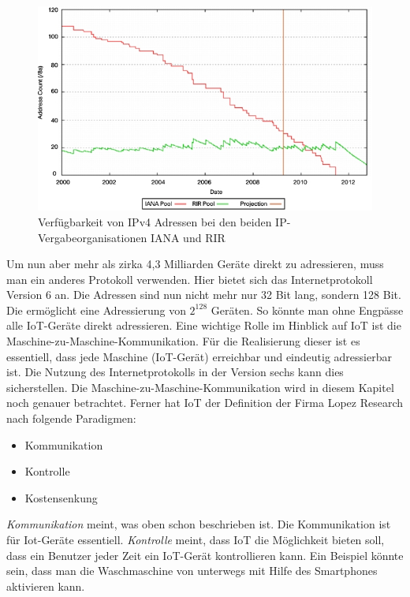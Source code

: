 \begin{figure}
\includegraphics[scale=0.7]{bilder/ipv4cisco} 
\caption{Verfügbarkeit von IPv4 Adressen bei den beiden IP-Vergabeorganisationen IANA und RIR \cite{cisco}}
\label{IPv4}
\end{figure}


Um nun aber mehr als zirka 4,3 Milliarden Geräte direkt zu adressieren, muss man ein anderes Protokoll verwenden. Hier bietet sich das Internetprotokoll Version 6 an. Die Adressen sind nun nicht mehr nur 32 Bit lang, sondern 128 Bit. Die ermöglicht eine Adressierung von $2^{128}$ Geräten. So könnte man ohne Engpässe alle IoT-Geräte direkt adressieren. 
Eine wichtige Rolle im Hinblick auf IoT ist die Maschine-zu-Maschine-Kommunikation. Für die Realisierung dieser ist es essentiell, dass jede Maschine (IoT-Gerät) erreichbar und eindeutig adressierbar ist. Die Nutzung des Internetprotokolls in der Version sechs kann dies sicherstellen. Die Maschine-zu-Maschine-Kommunikation wird in diesem Kapitel noch genauer betrachtet.     
Ferner hat IoT der Definition der Firma Lopez Research nach folgende Paradigmen:
\begin{itemize}
\item Kommunikation
\item Kontrolle
\item Kostensenkung
\end{itemize} 
\textit{Kommunikation} meint, was oben schon beschrieben ist. Die Kommunikation ist für Iot-Geräte essentiell. \textit{Kontrolle} meint, dass IoT die Möglichkeit bieten soll, dass ein Benutzer jeder Zeit ein IoT-Gerät kontrollieren kann. Ein Beispiel könnte sein, dass man die Waschmaschine von unterwegs mit Hilfe des Smartphones aktivieren kann. 

\cite{cisco}
